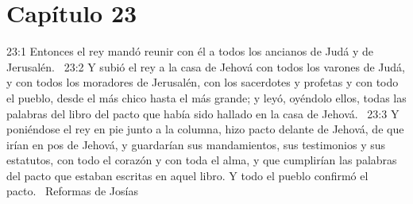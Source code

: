 \section*{Capítulo 23 }

23:1 Entonces el rey mandó reunir con él a todos los ancianos de Judá y de Jerusalén.  
23:2 Y subió el rey a la casa de Jehová con todos los varones de Judá, y con todos los moradores de Jerusalén, con los sacerdotes y profetas y con todo el pueblo, desde el más chico hasta el más grande; y leyó, oyéndolo ellos, todas las palabras del libro del pacto que había sido hallado en la casa de Jehová.  
23:3 Y poniéndose el rey en pie junto a la columna, hizo pacto delante de Jehová, de que irían en pos de Jehová, y guardarían sus mandamientos, sus testimonios y sus estatutos, con todo el corazón y con toda el alma, y que cumplirían las palabras del pacto que estaban escritas en aquel libro. Y todo el pueblo confirmó el pacto.  
Reformas de Josías  

